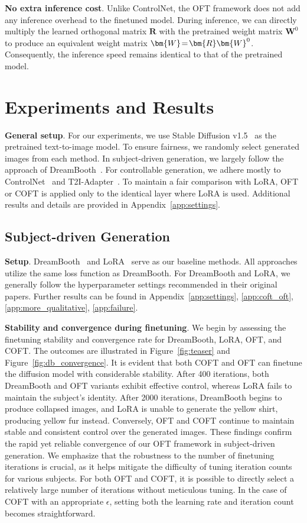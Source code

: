 \textbf{No extra inference cost}. Unlike ControlNet, the OFT framework does not add any inference overhead to the finetuned model. During inference, we can directly multiply the learned orthogonal matrix $\bm{R}$ with the pretrained weight matrix $\bm{W}^0$ to produce an equivalent weight matrix $\thickmuskip=2mu \medmuskip=2mu \bm{W}=\bm{R}\bm{W}^0$. Consequently, the inference speed remains identical to that of the pretrained model.

\section{Experiments and Results}

\textbf{General setup}. For our experiments, we use Stable Diffusion v1.5~\cite{rombach2022high} as the pretrained text-to-image model. To ensure fairness, we randomly select generated images from each method. In subject-driven generation, we largely follow the approach of DreamBooth~\cite{ruiz2023dreambooth}. For controllable generation, we adhere mostly to ControlNet~\cite{zhang2023adding} and T2I-Adapter~\cite{mou2023t2i}. To maintain a fair comparison with LoRA, OFT or COFT is applied only to the identical layer where LoRA is used. Additional results and details are provided in Appendix~\ref{app:settings}.

\subsection{Subject-driven Generation}

\textbf{Setup}. DreamBooth~\cite{ruiz2023dreambooth} and LoRA~\cite{hulora2022} serve as our baseline methods. All approaches utilize the same loss function as DreamBooth. For DreamBooth and LoRA, we generally follow the hyperparameter settings recommended in their original papers. Further results can be found in Appendix~\ref{app:settings}, \ref{app:coft_oft}, \ref{app:more_qualitative}, \ref{app:failure}.

\textbf{Stability and convergence during finetuning}. We begin by assessing the finetuning stability and convergence rate for DreamBooth, LoRA, OFT, and COFT. The outcomes are illustrated in Figure~\ref{fig:teaser} and Figure~\ref{fig:db_convergence}. It is evident that both COFT and OFT can finetune the diffusion model with considerable stability. After 400 iterations, both DreamBooth and OFT variants exhibit effective control, whereas LoRA fails to maintain the subject's identity. After 2000 iterations, DreamBooth begins to produce collapsed images, and LoRA is unable to generate the yellow shirt, producing yellow fur instead. Conversely, OFT and COFT continue to maintain stable and consistent control over the generated images. These findings confirm the rapid yet reliable convergence of our OFT framework in subject-driven generation. We emphasize that the robustness to the number of finetuning iterations is crucial, as it helps mitigate the difficulty of tuning iteration counts for various subjects. For both OFT and COFT, it is possible to directly select a relatively large number of iterations without meticulous tuning. In the case of COFT with an appropriate $\epsilon$, setting both the learning rate and iteration count becomes straightforward.

